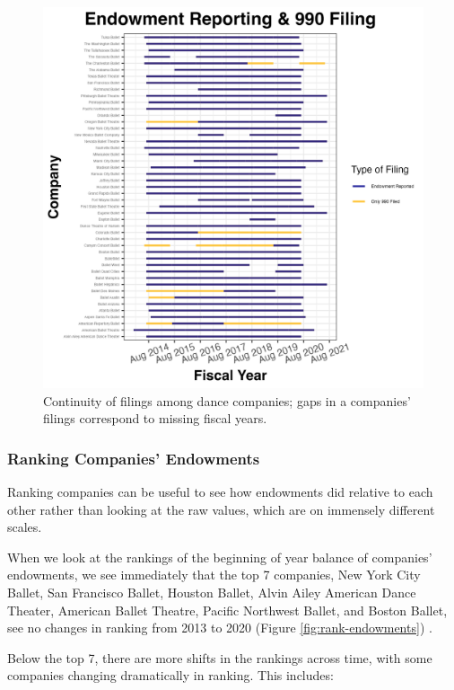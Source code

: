 \documentclass[Dance Data
Project,article,submit,moreauthors,pdftex]{mdpi}
\begin{document}
\begin{figure}[H]
\includegraphics[width=0.9\linewidth,]{../images/gap_plot_endowment} \caption{\label{fig:gap-plot}Continuity of filings among dance companies; gaps in a companies' filings correspond to missing fiscal years.}\label{fig:unnamed-chunk-3}
\end{figure}

\hypertarget{ranking-companies-endowments}{%
\subsubsection{Ranking Companies'
Endowments}\label{ranking-companies-endowments}}

Ranking companies can be useful to see how endowments did relative to
each other rather than looking at the raw values, which are on immensely
different scales.

When we look at the rankings of the beginning of year balance of
companies' endowments, we see immediately that the top 7 companies, New
York City Ballet, San Francisco Ballet, Houston Ballet, Alvin Ailey
American Dance Theater, American Ballet Theatre, Pacific Northwest
Ballet, and Boston Ballet, see no changes in ranking from 2013 to 2020
(Figure \ref{fig:rank-endowments}) .

Below the top 7, there are more shifts in the rankings across time, with
some companies changing dramatically in ranking. This includes:
\end{document}
